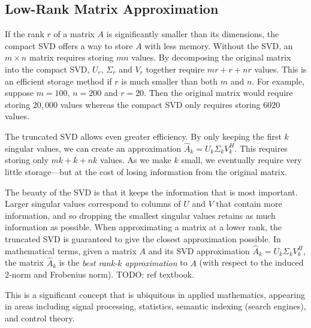 \subsection*{Low-Rank Matrix Approximation}
If the rank $r$ of a matrix $A$ is significantly smaller than its dimensions, the compact SVD offers a way to store $A$ with less memory.
Without the SVD, an $m\times n$ matrix requires storing $mn$ values.
By decomposing the original matrix into the compact SVD, $U_r$, $\Sigma_r$ and $V_r$ together require $mr+r+nr$ values.
This is an efficient storage method if $r$ is much smaller than both $m$ and $n$.
For example, suppose $m=100$, $n=200$ and $r=20$.
Then the original matrix would require storing $20,000$ values whereas the compact SVD only requires storing $6020$ values.

The truncated SVD allows even greater efficiency.
By only keeping the first $k$ singular values, we can create an approximation $\widehat A_k = U_k\Sigma_k V_k^H$.
This requires storing only $mk+k+nk$ values.
As we make $k$ small, we eventually require very little storage---but at the cost of losing information from the original matrix.

The beauty of the SVD is that it keeps the information that is most important. 
Larger singular values correspond to columns of $U$ and $V$ that contain more information, and so dropping the smallest singular values retains as much information as possible.
When approximating a matrix at a lower rank, the truncated SVD is guaranteed to give the closest approximation possible.
In mathematical terms, given a matrix $A$ and its SVD approximation $\widehat A_k = U_k\Sigma_k V_k^H$, the matrix $\widehat A_k$ is the \emph{best rank-$k$ approximation} to $A$ (with respect to the induced 2-norm and Frobenius norm). TODO: ref textbook.

This is a significant concept that is ubiquitous in applied mathematics, appearing in areas including signal processing, statistics, semantic indexing (search engines), and control theory.

